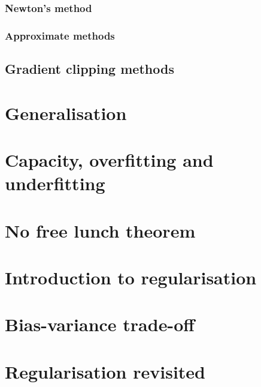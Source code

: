 \subsubsection{Newton's method}

\subsubsection{Approximate methods}



\subsection{Gradient clipping methods}


\section{Generalisation}


\section{Capacity, overfitting and underfitting}



\section{No free lunch theorem}


\section{Introduction to regularisation}


\section{Bias-variance trade-off}







\section{Regularisation revisited}
